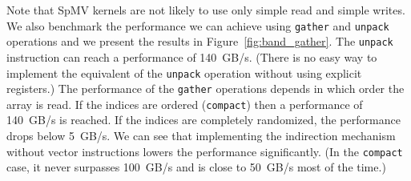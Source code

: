 \documentclass{sig-alternate}
\begin{document}
Note that SpMV kernels are not likely to use only simple read and simple
writes. We also benchmark the performance we
can achieve using {\tt gather} and {\tt unpack} operations and we
present the results in Figure~\ref{fig:band_gather}. The {\tt unpack}
instruction can reach a performance of 140~GB/s. (There is no easy way
to implement the equivalent of the {\tt unpack} operation without
using explicit registers.) The performance of the {\tt gather}
operations depends in which order the array is read. If the indices
are ordered ({\tt compact}) then a performance of 140~GB/s is
reached. If the indices are completely randomized, the performance
drops below 5~GB/s. We can see that implementing the
indirection mechanism without vector instructions lowers the
performance significantly. (In the {\tt compact} case, it never
surpasses 100~GB/s and is close to 50~GB/s most of the time.)
\def\ww{.19\textwidth}
\end{document}
